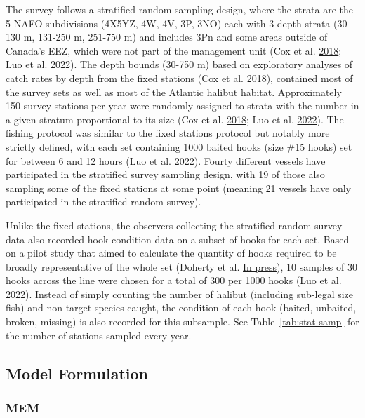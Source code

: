 \documentclass[12pt]{article}\usepackage[]{graphicx}\usepackage[]{color}
\begin{document}
The survey follows a stratified random sampling design, where the strata are the 5 NAFO subdivisions (4X5YZ, 4W, 4V, 3P, 3NO) each with 3 depth strata (30-130 m, 131-250 m, 251-750 m) and includes 3Pn and some areas outside of Canada's EEZ, which were not part of the management unit (Cox et al. \protect\hyperlink{ref-Cox2018}{2018}; Luo et al. \protect\hyperlink{ref-Luo2022}{2022}). The depth bounds (30-750 m) based on exploratory analyses of catch rates by depth from the fixed stations (Cox et al. \protect\hyperlink{ref-Cox2018}{2018}), contained most of the survey sets as well as most of the Atlantic halibut habitat. Approximately 150 survey stations per year were randomly assigned to strata with the number in a given stratum proportional to its size (Cox et al. \protect\hyperlink{ref-Cox2018}{2018}; Luo et al. \protect\hyperlink{ref-Luo2022}{2022}). The fishing protocol was similar to the fixed stations protocol but notably more strictly defined, with each set containing 1000 baited hooks (size \#15 hooks) set for between 6 and 12 hours (Luo et al. \protect\hyperlink{ref-Luo2022}{2022}). Fourty different vessels have participated in the stratified survey sampling design, with 19 of those also sampling some of the fixed stations at some point (meaning 21 vessels have only participated in the stratified random survey).

Unlike the fixed stations, the observers collecting the stratified random survey data also recorded hook condition data on a subset of hooks for each set. Based on a pilot study that aimed to calculate the quantity of hooks required to be broadly representative of the whole set (Doherty et al. \protect\hyperlink{ref-Doherty2017}{In press}), 10 samples of 30 hooks across the line were chosen for a total of 300 per 1000 hooks (Luo et al. \protect\hyperlink{ref-Luo2022}{2022}). Instead of simply counting the number of halibut (including sub-legal size fish) and non-target species caught, the condition of each hook (baited, unbaited, broken, missing) is also recorded for this subsample. See Table~\ref{tab:stat-samp} for the number of stations sampled every year.

\hypertarget{model-formulation}{%
\subsection{Model Formulation}\label{model-formulation}}

\hypertarget{mem}{%
\subsubsection{MEM}\label{mem}}
\end{document}
